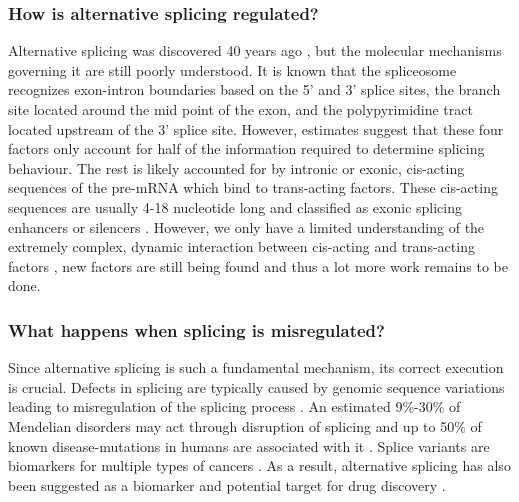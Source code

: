 \subsubsection{How is alternative splicing regulated?}
Alternative splicing was discovered 40 years ago \cite{discoveryofsplicing}, but the molecular mechanisms governing it are still poorly understood. It is known that the spliceosome recognizes exon-intron boundaries based on the 5' and 3' splice sites, the branch site located around the mid point of the exon, and the polypyrimidine tract located upstream of the 3' splice site. However, estimates suggest that these four factors only account for half of the information required to determine splicing behaviour. The rest is likely accounted for by intronic or exonic, cis-acting sequences of the pre-mRNA which bind to trans-acting factors. These cis-acting sequences are usually 4-18 nucleotide long and classified as exonic splicing enhancers or silencers \cite{splicing_current_perspectives}.
However, we only have a limited understanding of the extremely complex, dynamic interaction between cis-acting and trans-acting factors \cite{splicing_current_perspectives}, new factors are still being found \cite{splicing_current_perspectives} and thus a lot more work remains to be done.

\subsubsection{What happens when splicing is misregulated?}
Since alternative splicing is such a fundamental mechanism, its correct execution is crucial. Defects in splicing are typically caused by genomic sequence variations leading to misregulation of the splicing process \cite{splicinganddisease}. An estimated 9\%-30\% of Mendelian disorders may act through disruption of splicing \cite{comparison} and up to 50\% of known disease-mutations in humans are associated with it \cite{50diseasessplicing}. 
Splice variants are biomarkers for multiple types of cancers \cite{cancer} \cite{splicingcausescancer}. As a result, alternative splicing has also been suggested as a biomarker and potential target for drug discovery \cite{drugdiscoverysplicing}. 


